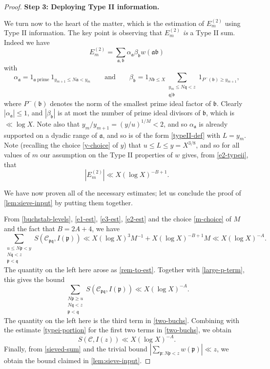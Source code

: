\documentclass[11pt,reqno]{amsart}
\numberwithin{equation}{section}
\theoremstyle{definition}
\theoremstyle{remark}
\newcommand{\mc}{\mathcal}
\newcommand{\mf}{\mathfrak}
\renewcommand{\le}{\leqslant}
\renewcommand{\ge}{\geqslant}
\begin{document}
\begin{proof}
\textbf{Step 3: Deploying Type II information.}

We turn now to the heart of the matter, which is the estimation of $E^{(2)}_m$ using Type II information. The key point is observing that $E^{(2)}_m$ \emph{is} a Type II sum. Indeed we have
\begin{equation}\label{e2-typeii} E^{(2)}_m = \sum_{\mf{a}, \mf{b}} \alpha_{\mf{a}} \beta_{\mf{b}} w(\mf{a} \mf{b})\end{equation}
with
\[ \alpha_{\mf{a}} = 1_{\mf{a} \operatorname{prime}} 1_{y_{m+1} \le N\mf{a} < y_m} \qquad \mbox{and} \qquad \beta_{\mf{b}} = 1_{N\mf{b}\le X} \sum_{\substack{y_m \le N \mf{q} < z \\ \mf{q} | \mf{b}}} 1_{P^{-}(\mf{b}) \ge y_{m+1}},\]
where $P^{-}(\mf{b})$ denotes the norm of the smallest prime ideal factor of $\mf{b}$. Clearly $|\alpha_{\mf{a}}| \le 1$, and $|\beta_{\mf{b}}|$ is at most the number of prime ideal divisors of $\mf{b}$, which is $\ll \log X$. Note also that $y_m/y_{m+1} = (y/u)^{1/M} < 2$, and so $\alpha_{\mf{a}}$ is already supported on a dyadic range of $\mf{a}$, and so is of the form \cref{typeII-def} with $L = y_m$. Note (recalling the choice \cref{y-choice} of $y$) that $u \le L \le y = X^{3/8}$, and so for all values of $m$ our assumption on the Type II properties of $w$ gives, from \cref{e2-typeii}, that 
\begin{equation}\label{e2-est} |E^{(2)}_m| \ll X (\log X)^{-B + 1}.\end{equation}

We have now proven all of the necessary estimates; let us conclude the proof of \cref{lem:sieve-input} by putting them together.

From \cref{buchstab-levels}, \cref{e1-est}, \cref{e3-est}, \cref{e2-est} and the choice \cref{m-choice} of $M$ and the fact that $B = 2A + 4$, we have
\[ \sum_{\substack{u \le N\mf{p} < y \\ N\mf{q} < z \\ \mf{p} < \mf{q}}}   S(\mc{C}_{\mf{p}\mf{q}},I(\mf{p}))  \ll X (\log X)^3 M^{-1} + X(\log X)^{-B + 1}M  \ll X(\log X)^{-A}.\] The quantity on the left here arose as \cref{rem-to-est}. Together with \cref{large-p-term}, this gives the bound
\[ \sum_{\substack{N\mf{p} \ge u \\ N\mf{q} < z \\ \mf{p} < \mf{q}}}   S(\mc{C}_{\mf{p}\mf{q}},I(\mf{p})) \ll  X(\log X)^{-A}.\] The quantity on the left here is the third term in \cref{two-buchs}. Combining with the estimate \cref{typei-portion} for the first two terms in \cref{two-buchs}, we obtain
\[ S(\mc{C}, I(z)) \ll X (\log X)^{-A}.\]
Finally, from \cref{sieved-sum} and the trivial bound $|\sum_{\mf{p} : N\mf{p} < z} w(\mf{p})| \ll z$, we obtain the bound claimed in \cref{lem:sieve-input}.
\end{proof}
\end{document}
